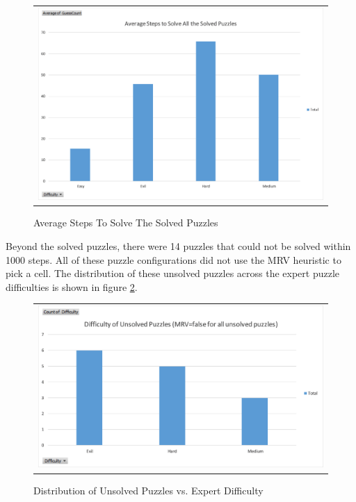\documentclass{article}
\begin{document}
\begin{figure}[H]%
	\centering\begin{tabular}{c}
		\includegraphics[scale=0.5]{plots/avg-steps-solved-puzzles.png}\\
	\end{tabular}
	\caption{Average Steps To Solve The Solved Puzzles}%
	\label{fig:avg_steps_solved_puzzles}%
\end{figure}

Beyond the solved puzzles, there were 14 puzzles that could not be solved within 1000 steps. All of these puzzle configurations did not use the MRV heuristic to pick a cell. The distribution of these unsolved puzzles across the expert puzzle difficulties is shown in figure \ref{fig:dist_unsolved_vs_diff}.\\

\begin{figure}[H]%
	\centering\begin{tabular}{c}
		\includegraphics[scale=0.5]{plots/count-unsolved-puzzles-vs-expert-diff.png}\\
	\end{tabular}
	\caption{Distribution of Unsolved Puzzles vs. Expert Difficulty}%
	\label{fig:dist_unsolved_vs_diff}%
\end{figure}
\end{document}
